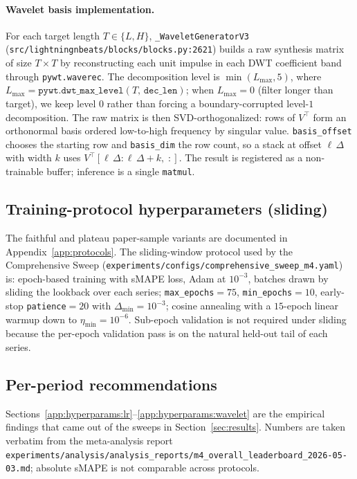 \documentclass{article}
\begin{document}
\paragraph{Wavelet basis implementation.} For each target length $T \in \{L, H\}$, \texttt{\_WaveletGeneratorV3} (\texttt{src/lightningnbeats/blocks/blocks.py:2621}) builds a raw synthesis matrix of size $T \times T$ by reconstructing each unit impulse in each DWT coefficient band through \texttt{pywt.waverec}. The decomposition level is $\min(L_{\max}, 5)$, where $L_{\max}=\texttt{pywt.dwt\_max\_level}(T,\,\texttt{dec\_len})$; when $L_{\max}=0$ (filter longer than target), we keep level $0$ rather than forcing a boundary-corrupted level-$1$ decomposition. The raw matrix is then SVD-orthogonalized: rows of $V^\top$ form an orthonormal basis ordered low-to-high frequency by singular value. \texttt{basis\_offset} chooses the starting row and \texttt{basis\_dim} the row count, so a stack at offset $\ell\,\Delta$ with width $k$ uses $V^\top[\ell\,\Delta:\ell\,\Delta+k,\;:]$. The result is registered as a non-trainable buffer; inference is a single \texttt{matmul}.

\subsection{Training-protocol hyperparameters (sliding)}
\label{app:hyperparams:sliding}

The faithful and plateau paper-sample variants are documented in Appendix~\ref{app:protocols}. The sliding-window protocol used by the Comprehensive Sweep (\texttt{experiments/configs/comprehensive\_sweep\_m4.yaml}) is: epoch-based training with sMAPE loss, Adam at $10^{-3}$, batches drawn by sliding the lookback over each series; \texttt{max\_epochs}$=75$, \texttt{min\_epochs}$=10$, early-stop \texttt{patience}$=20$ with $\Delta_{\min}=10^{-3}$; cosine annealing with a $15$-epoch linear warmup down to $\eta_{\min}=10^{-6}$. Sub-epoch validation is not required under sliding because the per-epoch validation pass is on the natural held-out tail of each series.

\subsection{Per-period recommendations}
\label{app:hyperparams:perperiod}

Sections~\ref{app:hyperparams:lr}--\ref{app:hyperparams:wavelet} are the empirical findings that came out of the sweeps in Section~\ref{sec:results}. Numbers are taken verbatim from the meta-analysis report \texttt{experiments/analysis/analysis\_reports/m4\_overall\_leaderboard\_2026-05-03.md}; absolute sMAPE is not comparable across protocols.
\end{document}
